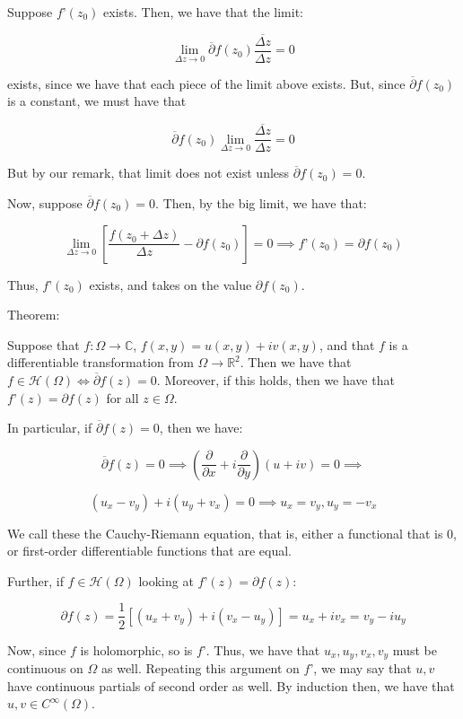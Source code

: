 \documentclass[10pt]{article}
\newcommand{\calH}{\mathcal{H}}
\begin{document}
Suppose $f’(z_0)$ exists. Then, we have that the limit:

$$ \lim_{\Delta z \to 0 } \overline{\partial} f(z_0) \frac{\overline{\Delta z}}{\Delta z} = 0$$

exists, since we have that each piece of the limit above exists. But, since $\overline{\partial} f(z_0)$ is a constant, we must have that

$$\overline{\partial} f(z_0) \lim_{\Delta z \to 0 }  \frac{\overline{\Delta z}}{\Delta z} = 0$$

But by our remark, that limit does not exist unless $\overline{\partial} f(z_0) = 0$.

Now, suppose $\overline{\partial} f(z_0) = 0$. Then, by the big limit, we have that:

$$ \lim_{\Delta z \to 0 } \left[ \frac{ f(z_0 + \Delta z)}{\Delta z} - \partial f(z_0)  \right]  = 0 \implies f’(z_0) = \partial f(z_0) $$

Thus, $f’(z_0)$ exists, and takes on the value $\partial f(z_0)$. 

Theorem:

Suppose that $f: \Omega \to \mathbb{C}$, $f(x,y) = u(x,y) + i v(x,y)$, and that $f$ is a differentiable transformation from $\Omega \to \mathbb{R}^2$. Then we have that $f \in \calH(\Omega) \iff \overline{\partial}f(z) = 0$. Moreover, if this holds, then we have that $f’(z) = \partial f(z)$ for all $z  \in \Omega$. 

In particular, if $\overline{\partial}f(z) = 0$, then we have:

$$\overline{\partial}f(z) = 0 \implies  \left(\frac{\partial}{\partial x} + i \frac{\partial}{\partial y}\right) (u + iv) = 0 \implies $$

$$ (u_x - v_y) + i (u_y + v_x) = 0 \implies u_x = v_y, u_y = -v_x $$

We call these the Cauchy-Riemann equation, that is, either a functional that is 0, or first-order differentiable functions that are equal.

Further, if $f \in \calH(\Omega)$ looking at $f’(z) = \partial f(z)$:

$$ \partial f(z) = \frac{1}{2} \left[ (u_x + v_y)  + i (v_x - u_y) \right] = u_x + i v_x =  v_y - i u_y $$

Now, since $f$ is holomorphic, so is $f’$. Thus, we have that $u_x, u_y, v_x, v_y$ must be continuous on $\Omega$ as well. Repeating this argument on $f’$, we may say that $u,v$ have continuous partials of second order as well. By induction then, we have that $u,v \in C^{\infty} (\Omega)$. 
\end{document}

